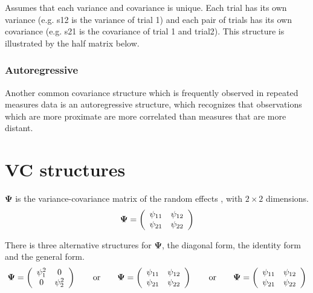 \documentclass[12pt, a4paper]{report}
\theoremstyle{plain}
\theoremstyle{definition}
\theoremstyle{remark}
\begin{document}
Assumes that each variance and covariance is unique.
Each trial has its own variance (e.g. s12 is the variance of trial 1)
and each pair of trials has its own covariance (e.g. s21 is the covariance of trial 1 and trial2).
This structure is illustrated by the half matrix below.



\subsubsection{Autoregressive}

Another common covariance structure which is frequently observed
in repeated measures data is an autoregressive structure,
which recognizes that observations which are more proximate
are more correlated than measures that are more distant.







\section{VC structures}
$\boldsymbol{\Psi}$ is the variance-covariance matrix of the random effects ,
with $2 \times 2$ dimensions.
\begin{equation}
\boldsymbol{\Psi} =
\left(%
\begin{array}{c c}
\psi_{11} & \psi_{12}  \\
\psi_{21} & \psi_{22}  \\
\end{array}%
\right)
\end{equation}

There is three alternative structures for
$\boldsymbol{\Psi}$, the diagonal form, the identity form and the general form.
\[
\boldsymbol{\Psi} =
\left(%
\begin{array}{c c}
\psi^2_1 & 0  \\
0 & \psi^2_2  \\
\end{array}%
\right)\qquad \mathrm{or} \qquad \boldsymbol{\Psi} =
\left(%
\begin{array}{c c}
\psi_{11} & \psi_{12}  \\
\psi_{21} & \psi_{22}  \\
\end{array}%
\right)
\qquad \mathrm{or} \qquad \boldsymbol{\Psi} =
\left(%
\begin{array}{c c}
\psi_{11} & \psi_{12}  \\
\psi_{21} & \psi_{22}  \\
\end{array}%
\right)
\]
\end{document}
